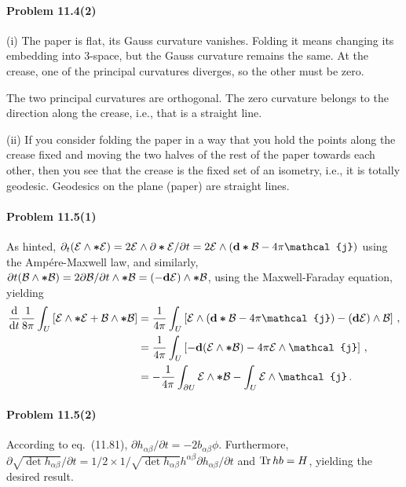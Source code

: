 \documentclass[a4paper,12pt]{article}
\def\d{\mathrm{d}}
\def\Tr{\ensuremath{\mathop{\rm Tr}}}
\newcommand{\problem}[1]{\paragraph{Problem #1}}
\begin{document}

\problem{11.4(2)} (i) The paper is flat, its Gauss curvature vanishes. Folding it means changing its embedding into 3-space, but the Gauss curvature remains the same. At the crease, one of the principal curvatures diverges, so the other must be zero.

The two principal curvatures are orthogonal. The zero curvature belongs to the direction along the crease, i.e., that is a straight line.

(ii) If you consider folding the paper in a way that you hold the points along the crease fixed and moving the two halves of the rest of the paper towards each other, then you see that the crease is the fixed set of an isometry, i.e., it is totally geodesic. Geodesics on the plane (paper) are straight lines.


\problem{11.5(1)} As hinted, $\partial_t (\mathcal{E}\wedge \boldsymbol{*}\mathcal{E}) =2\mathcal{E}\wedge \partial\boldsymbol{*}\mathcal{E}/\partial t = 2\mathcal{E}\wedge ({\bf d}\boldsymbol{*}\mathcal{B}-4\pi\mathcal{j})$ using the Ampére-Maxwell law, and similarly, $\partial t (\mathcal{B}\wedge \boldsymbol{*}\mathcal{B}) =2\partial\mathcal{B}/\partial t\wedge \boldsymbol{*}\mathcal{B} = (-{\bf d}\mathcal{E})\wedge\boldsymbol{*} \mathcal{B}$, using the Maxwell-Faraday equation, yielding
\[
 \begin{aligned}
  \frac{\d}{\d t}\frac{1}{8\pi}\int_U \left[ \mathcal{E}\wedge \boldsymbol{*}\mathcal{E} + \mathcal{B}\wedge\boldsymbol{*}\mathcal{B} \right] &=  \frac{1}{4\pi}\int_U \left[ \mathcal{E}\wedge ({\bf d}\boldsymbol{*}\mathcal{B}-4\pi\mathcal{j}) - ({\bf d}\mathcal{E})\wedge \mathcal{B}\right]\,,\\
  &= \frac{1}{4\pi}\int_U \left[ -{\bf d}(\mathcal{E}\wedge\boldsymbol{*}\mathcal{B}) -4\pi\mathcal{E}\wedge\mathcal{j}\right]\,,\\
  &= -\frac{1}{4\pi}\int_{\partial U}\mathcal{E}\wedge\boldsymbol{*}\mathcal{B}- \int_U \mathcal{E}\wedge\mathcal{j}\,.
 \end{aligned}
\]


\problem{11.5(2)} \hspace{-1.5ex}According to eq.\ (11.81), $\partial h_{\alpha\beta}/\partial t = -2b_{\alpha\beta}\phi$. Furthermore, $\partial \sqrt{\det h_{\alpha\beta}}/\partial t = 1/2\times1/\sqrt{\det h_{\alpha\beta}} h^{\alpha\beta}\partial h_{\alpha\beta}/\partial t$ and $\Tr hb = H$, yielding the desired result.
\end{document}
